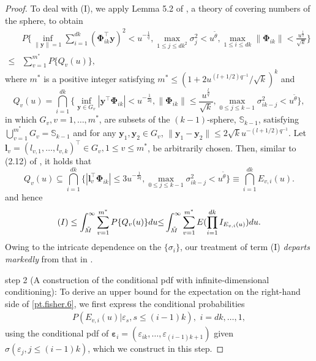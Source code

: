 \documentclass[ejsv2]{imsart}
\theoremstyle{plain}
\theoremstyle{definition}
\theoremstyle{remark}
\begin{document}
\begin{proof}
To deal with (I), we apply Lemma 5.2 of \cite{Eldar2012S}, a theory of covering numbers of the sphere, to obtain
\begin{equation}\label{pt.fisher.Qj}
\begin{split}
&P\bigg\{
\inf\limits_{\lVert \bm{y}\rVert=1}\sum_{i=1}^{dk}(\bm{\Phi}_{ik}^\top\bm{y})^2<u^{-\frac{1}{q}},\max\limits_{1\leq j\leq dk^2}\sigma_j^2<u^{\tilde{\theta}},{\max\limits_{1\leq i\leq dk}\lVert\bm{\Phi}_{ik}\rVert<\frac{u^{\frac{l}{q}}}{\sqrt{k}}}\bigg\} \\
\leq&
\sum_{v=1}^{m^\ast}P\{Q_v(u)\},
\end{split}
\end{equation}
where  $m^\ast$
is a positive integer satisfying
$m^{\ast} \leq {(1+2u^{(l+1/2)q^{-1}}/\sqrt{k})^k}$ and
\begin{equation*}
Q_v(u)=\bigcap_{i=1}^{dk}\{\inf\limits_{\bm{y}\in G_v}|\bm{y}^\top\bm{\Phi}_{ik}|<u^{-\frac{1}{2q}},\lVert\bm{\Phi}_{ik}\rVert\leq\frac{u^{\frac{l}{q}}}{\sqrt{k}},{\max\limits_{0\leq j\leq k-1}\sigma^2_{ik-j}}<u^{\tilde{\theta}}\},
\end{equation*}
{in which
$G_v, v=1,\ldots, m^\ast$,
are subsets of the $(k-1)$-sphere, $\mathbb{S}_{k-1}$,
satisfying $\bigcup_{v=1}^{m^{\ast}}G_v=\mathbb{S}_{k-1}$ and for any $\bm{y}_1,\bm{y}_2\in G_v$, $\lVert \bm{y}_1-\bm{y}_2\rVert\leq 2\sqrt{k}u^{-(l+1/2)q^{-1}}$.} 
Let $\bm{l}_v=(l_{v,1},\ldots ,l_{v,k})^{\top} \in G_v, 1\leq v\leq m^\ast$,
be arbitrarily chosen. Then, {similar to (2.12) of \cite{Ing2003}}, it holds that
\begin{equation*}
Q_v(u)\subseteq\bigcap_{i=1}^{dk}\{|\bm{l}_v^\top\bm{\Phi}_{ik}|\leq3u^{-\frac{1}{2q}},{\max\limits_{0\leq j\leq k-1}\sigma^2_{ik-j}}<u^{\tilde{\theta}}\}\equiv\bigcap_{i=1}^{dk}E_{v,i}(u).
\end{equation*}
and hence
\begin{equation}\label{pt.fisher.6}
{\rm (I)} \leq 
\int_{\tilde{M}}^{\infty}
\sum_{v=1}^{m^\ast} P\{Q_v(u)\} du {\leq} \int_{\tilde{M}}^{\infty}
\sum_{v=1}^{m^\ast}E(\prod_{i=1}^{dk}I_{E_{v,i}(u)})du.
\end{equation}
Owing to the intricate dependence on the
$\{\sigma_i\}$,
our treatment of term (I) {\it departs markedly } from that in
\cite{Ing2003}.

\vspace{0.3cm}
{\sc step 2 (A construction
of the conditional pdf with infinite-dimensional conditioning):}
To derive an upper bound for the expectation on the right-hand side of \eqref{pt.fisher.6},
 we first express the conditional probabilities
\begin{eqnarray*}
P(E_{v,i}(u)|\varepsilon_s,s\leq (i-1)k), \,\,i=dk,\ldots, 1,
\end{eqnarray*}
using the conditional pdf of 
$\bm{\varepsilon}_i=(\varepsilon_{ik},\ldots,
\varepsilon_{(i-1)k+1})$ given $\sigma(\varepsilon_j,j\leq (i-1)k)$, which we construct in this step.


\end{proof}
\end{document}
